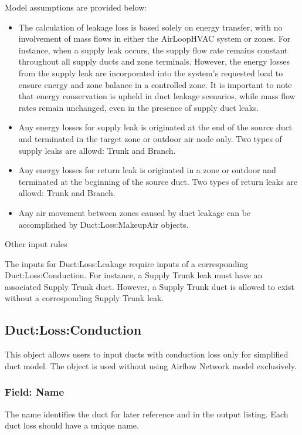 Model assumptions are provided below:

\begin{itemize}
\item
  The calculation of leakage loss is based solely on energy transfer, with no involvement of mass flows in either the AirLoopHVAC system or zones. For instance, when a supply leak occurs, the supply flow rate remains constant throughout all supply ducts and zone terminals. However, the energy losses from the supply leak are incorporated into the system's requested load to ensure energy and zone balance in a controlled zone. It is important to note that energy conservation is upheld in duct leakage scenarios, while mass flow rates remain unchanged, even in the presence of supply duct leaks.
\item
  Any energy losses for supply leak is originated at the end of the source duct and terminated in the target zone or outdoor air node only. Two types of supply leaks are allowd: Trunk and Branch.
\item
  Any energy losses for return leak is originated in a zone or outdoor and terminated at the beginning of the source duct. Two types of return leaks are allowd: Trunk and Branch.
\item
  Any air movement between zones caused by duct leakage can be accomplished by Duct:Loss:MakeupAir objects.
\end{itemize}

Other input rules

The inputs for Duct:Loss:Leakage require inputs of a corresponding Duct:Loss:Conduction. For instance, a Supply Trunk leak must have an associated Supply Trunk duct. However, a Supply Trunk duct is allowed to exist without a corresponding Supply Trunk leak.

\subsection{Duct:Loss:Conduction}\label{ductlossconduction}

This object allows users to input ducts with conduction loss only for simplified duct model. The object is used without using Airflow Network model exclusively. 

\subsubsection{Field: Name}\label{field-name-duct-conduction}

The name identifies the duct for later reference and in the output listing. Each duct loss should have a unique name.

